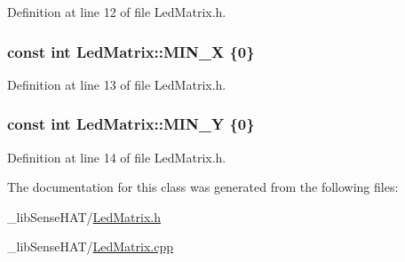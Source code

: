 Definition at line 12 of file Led\+Matrix.\+h.

\subsubsection[{\texorpdfstring{M\+I\+N\+\_\+X}{MIN_X}}]{\setlength{\rightskip}{0pt plus 5cm}const int Led\+Matrix\+::\+M\+I\+N\+\_\+X \{0\}\hspace{0.3cm}{\ttfamily [static]}}\hypertarget{class_led_matrix_a30e3af90d4c9a83aec44e71914f86aa3}{}\label{class_led_matrix_a30e3af90d4c9a83aec44e71914f86aa3}


Definition at line 13 of file Led\+Matrix.\+h.

\subsubsection[{\texorpdfstring{M\+I\+N\+\_\+Y}{MIN_Y}}]{\setlength{\rightskip}{0pt plus 5cm}const int Led\+Matrix\+::\+M\+I\+N\+\_\+Y \{0\}\hspace{0.3cm}{\ttfamily [static]}}\hypertarget{class_led_matrix_a4bb052cfec297bc54387decb20a0f17f}{}\label{class_led_matrix_a4bb052cfec297bc54387decb20a0f17f}


Definition at line 14 of file Led\+Matrix.\+h.



The documentation for this class was generated from the following files\+:\begin{DoxyCompactItemize}
\item 
\+\_\+lib\+Sense\+H\+A\+T/\hyperlink{_led_matrix_8h}{Led\+Matrix.\+h}\item 
\+\_\+lib\+Sense\+H\+A\+T/\hyperlink{_led_matrix_8cpp}{Led\+Matrix.\+cpp}\end{DoxyCompactItemize}
